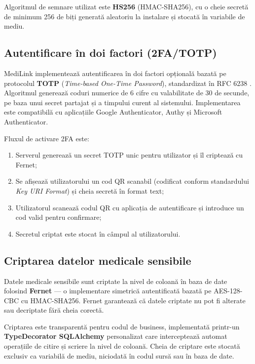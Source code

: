 Algoritmul de semnare utilizat este \textbf{HS256} (HMAC-SHA256), cu o cheie secretă de minimum 256 de biți generată aleatoriu la instalare și stocată în variabile de mediu.

\subsection{Autentificare în doi factori (2FA/TOTP)}

MediLink implementează autentificarea în doi factori opțională bazată pe protocolul \textbf{TOTP} (\textit{Time-based One-Time Password}), standardizat în RFC 6238 \cite{rfc6238}. Algoritmul generează coduri numerice de 6 cifre cu valabilitate de 30 de secunde, pe baza unui secret partajat și a timpului curent al sistemului. Implementarea este compatibilă cu aplicațiile Google Authenticator, Authy și Microsoft Authenticator.

Fluxul de activare 2FA este:
\begin{enumerate}
  \item Serverul generează un secret TOTP unic pentru utilizator și îl criptează cu Fernet;
  \item Se afișează utilizatorului un cod QR scanabil (codificat conform standardului \textit{Key URI Format}) și cheia secretă în format text;
  \item Utilizatorul scanează codul QR cu aplicația de autentificare și introduce un cod valid pentru confirmare;
  \item Secretul criptat este stocat în câmpul  al utilizatorului.
\end{enumerate}

\subsection{Criptarea datelor medicale sensibile}

Datele medicale sensibile sunt criptate la nivel de coloană în baza de date folosind \textbf{Fernet} \cite{cryptography2024} --- o implementare simetrică autentificată bazată pe AES-128-CBC cu HMAC-SHA256. Fernet garantează că datele criptate nu pot fi alterate sau decriptate fără cheia corectă.

Criptarea este transparentă pentru codul de business, implementată printr-un \textbf{TypeDecorator SQLAlchemy} personalizat care interceptează automat operațiile de citire și scriere la nivel de coloană. Cheia de criptare este stocată exclusiv ca variabilă de mediu, niciodată în codul sursă sau în baza de date.

